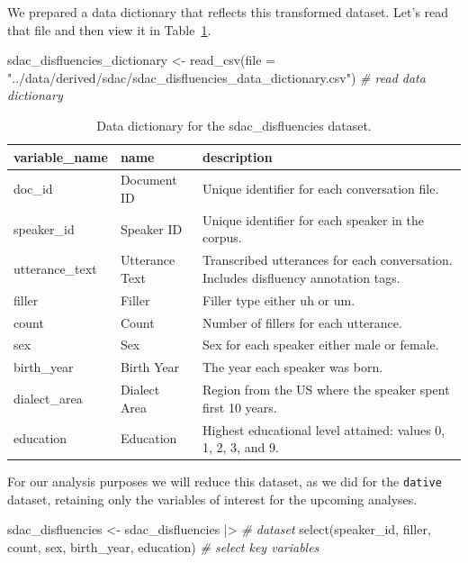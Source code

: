 \documentclass[
  letterpaper,
]{scrbook}
\newenvironment{Shaded}{\begin{snugshade}}{\end{snugshade}}
\newcommand{\AttributeTok}[1]{\textcolor[rgb]{0.00,0.00,0.00}{#1}}
\newcommand{\CommentTok}[1]{\textcolor[rgb]{0.00,0.00,0.00}{\textit{#1}}}
\newcommand{\FunctionTok}[1]{\textcolor[rgb]{0.00,0.00,0.00}{#1}}
\newcommand{\NormalTok}[1]{\textcolor[rgb]{0.00,0.00,0.00}{#1}}
\newcommand{\OtherTok}[1]{\textcolor[rgb]{0.00,0.00,0.00}{#1}}
\newcommand{\SpecialCharTok}[1]{\textcolor[rgb]{0.00,0.00,0.00}{#1}}
\newcommand{\StringTok}[1]{\textcolor[rgb]{0.00,0.00,0.00}{#1}}
\begin{document}
We prepared a data dictionary that reflects this transformed dataset.
Let's read that file and then view it in
Table~\ref{tbl-i-sdac-disfluencies-dictionary}.

\begin{Shaded}
\begin{Highlighting}[]
\NormalTok{sdac\_disfluencies\_dictionary }\OtherTok{\textless{}{-}} \FunctionTok{read\_csv}\NormalTok{(}\AttributeTok{file =} \StringTok{"../data/derived/sdac/sdac\_disfluencies\_data\_dictionary.csv"}\NormalTok{) }\CommentTok{\# read data dictionary}
\end{Highlighting}
\end{Shaded}

\hypertarget{tbl-i-sdac-disfluencies-dictionary}{}
\begin{table}
\caption{\label{tbl-i-sdac-disfluencies-dictionary}Data dictionary for the sdac\_disfluencies dataset. }\tabularnewline

\centering
\begin{tabular}{lll}
\toprule
variable\_name & name & description\\
\midrule
doc\_id & Document ID & Unique identifier for each conversation file.\\
speaker\_id & Speaker ID & Unique identifier for each speaker in the corpus.\\
utterance\_text & Utterance Text & Transcribed utterances for each conversation. Includes disfluency annotation tags.\\
filler & Filler & Filler type either uh or um.\\
count & Count & Number of fillers for each utterance.\\
\addlinespace
sex & Sex & Sex for each speaker either male or female.\\
birth\_year & Birth Year & The year each speaker was born.\\
dialect\_area & Dialect Area & Region from the US where the speaker spent first 10 years.\\
education & Education & Highest educational level attained: values 0, 1, 2, 3, and 9.\\
\bottomrule
\end{tabular}
\end{table}

For our analysis purposes we will reduce this dataset, as we did for the
\texttt{dative} dataset, retaining only the variables of interest for
the upcoming analyses.

\begin{Shaded}
\begin{Highlighting}[]
\NormalTok{sdac\_disfluencies }\OtherTok{\textless{}{-}} 
\NormalTok{  sdac\_disfluencies }\SpecialCharTok{|\textgreater{}} \CommentTok{\# dataset}
  \FunctionTok{select}\NormalTok{(speaker\_id, filler, count, sex, birth\_year, education) }\CommentTok{\# select key variables}
\end{Highlighting}
\end{Shaded}
\end{document}
